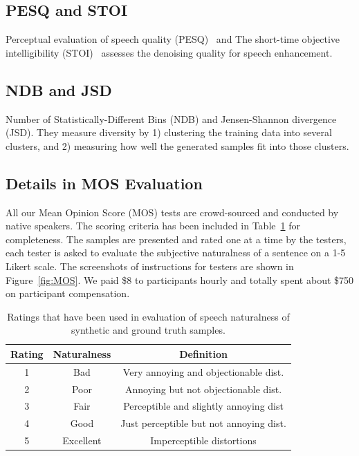 
\subsection{PESQ and STOI} Perceptual evaluation of speech quality (PESQ)~\cite{rix2001perceptual} and The short-time objective intelligibility (STOI)~\cite{taal2010short} assesses the denoising quality for speech enhancement.

\subsection{NDB and JSD}
Number of Statistically-Different Bins (NDB) and Jensen-Shannon divergence (JSD). They measure diversity by 1) clustering the training data into several clusters, and 2) measuring how well the generated samples fit into those clusters. 


\subsection{Details in MOS Evaluation}



All our Mean Opinion Score (MOS) tests are crowd-sourced and conducted by native speakers. The scoring criteria has been included in Table~\ref{matrix:naturalness} for completeness. The samples are presented and rated one at a time by the testers, each tester is asked to evaluate the subjective naturalness of a sentence on a 1-5 Likert scale. The screenshots of instructions for testers are shown in Figure~\ref{fig:MOS}. We paid \$8 to participants hourly and totally spent about \$750 on participant compensation.

\begin{table}[ht]
  \vspace{-2mm}
 \centering
    \small
  \begin{tabular}{ccc}

  \toprule
  Rating & Naturalness & Definition                           \\
  \midrule
  1      & Bad        &  Very annoying and objectionable dist. \\
  2      & Poor       &  Annoying but not objectionable dist. \\
  3      & Fair       &  Perceptible and slightly annoying dist\\
  4      & Good       & Just perceptible but not annoying dist. \\
  5      & Excellent  & Imperceptible distortions\\
  \bottomrule
  \end{tabular}
  \caption{Ratings that have been used in evaluation of speech naturalness of synthetic and ground truth samples.}
  \label{matrix:naturalness}
  \vspace{-4mm}
  \end{table}


